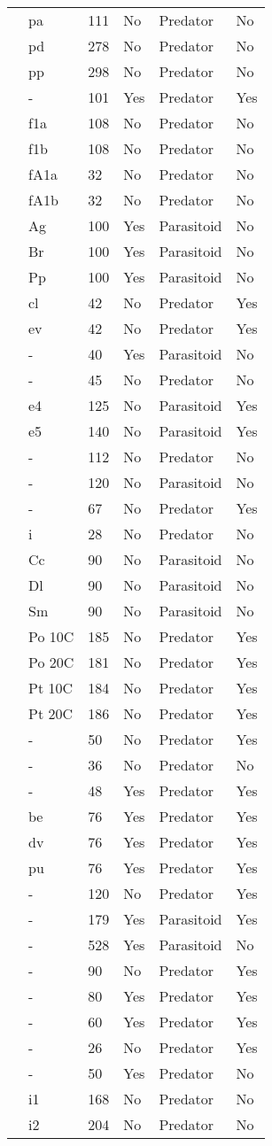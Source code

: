 \begin{longtable}{llllll}
\citet{Eveleigh:1982aa}&pa&111&No&Predator&No\tabularnewline
\citet{Eveleigh:1982aa}&pd&278&No&Predator&No\tabularnewline
\citet{Eveleigh:1982aa}&pp&298&No&Predator&No\tabularnewline
\citet{Fussmann:2005aa}&-&101&Yes&Predator&Yes\tabularnewline
\citet{Griffen:2007aa}&f1a&108&No&Predator&No\tabularnewline
\citet{Griffen:2007aa}&f1b&108&No&Predator&No\tabularnewline
\citet{Griffen:2007aa}&fA1a&32&No&Predator&No\tabularnewline
\citet{Griffen:2007aa}&fA1b&32&No&Predator&No\tabularnewline
\citet{Hassan:1976aa}&Ag&100&Yes&Parasitoid&No\tabularnewline
\citet{Hassan:1976aa}&Br&100&Yes&Parasitoid&No\tabularnewline
\citet{Hassan:1976aa}&Pp&100&Yes&Parasitoid&No\tabularnewline
\citet{Hossie:2016aa}&cl&42&No&Predator&Yes\tabularnewline
\citet{Hossie:2016aa}&ev&42&No&Predator&Yes\tabularnewline
\citet{Huffaker:1982aa}&-&40&Yes&Parasitoid&No\tabularnewline
\citet{Johnson:2006aa}&-&45&No&Predator&No\tabularnewline
\citet{Jones:1988aa}&e4&125&No&Parasitoid&Yes\tabularnewline
\citet{Jones:1988aa}&e5&140&No&Parasitoid&Yes\tabularnewline
\citet{Katz:1985ai}&-&112&No&Predator&No\tabularnewline
\citet{Kfir:1983aa}&-&120&No&Parasitoid&No\tabularnewline
\newpage
\citet{Kratina:2009aa}&-&67&No&Predator&Yes\tabularnewline
\citet{Krylov:1992aa}&i&28&No&Predator&No\tabularnewline
\citet{Kumar:1985aa}&Cc&90&No&Parasitoid&No\tabularnewline
\citet{Kumar:1985aa}&Dl&90&No&Parasitoid&No\tabularnewline
\citet{Kumar:1985aa}&Sm&90&No&Parasitoid&No\tabularnewline
\citet{Lang:2012aa}&Po 10C&185&No&Predator&Yes\tabularnewline
\citet{Lang:2012aa}&Po 20C&181&No&Predator&Yes\tabularnewline
\citet{Lang:2012aa}&Pt 10C&184&No&Predator&Yes\tabularnewline
\citet{Lang:2012aa}&Pt 20C&186&No&Predator&Yes\tabularnewline
\citet{Long:2012aa}&-&50&No&Predator&Yes\tabularnewline
\citet{Mansour:1991aa}&-&36&No&Predator&No\tabularnewline
\citet{Medoc:2013aa}&-&48&Yes&Predator&Yes\tabularnewline
\citet{Medoc:2015aa}&be&76&Yes&Predator&Yes\tabularnewline
\citet{Medoc:2015aa}&dv&76&Yes&Predator&Yes\tabularnewline
\citet{Medoc:2015aa}&pu&76&Yes&Predator&Yes\tabularnewline
\citet{Mertz:1968aa}&-&120&No&Predator&Yes\tabularnewline
\citet{Mills:2004aa}&-&179&Yes&Parasitoid&Yes\tabularnewline
\citet{Montoya:2000aa}&-&528&Yes&Parasitoid&No\tabularnewline
\citet{Omkar:2004aa}&-&90&No&Predator&Yes\tabularnewline
\citet{Prokopenko:2017aa}&-&80&Yes&Predator&Yes\tabularnewline
\citet{Pusack:2018aa}&-&60&Yes&Predator&Yes\tabularnewline
\citet{Reeve:1997aa}&-&26&No&Predator&Yes\tabularnewline
\citet{Salt:1974aa}&-&50&Yes&Predator&No\tabularnewline
\citet{Uttley:1980aa}&i1&168&No&Predator&No\tabularnewline
\citet{Uttley:1980aa}&i2&204&No&Predator&No\tabularnewline

\end{longtable}
